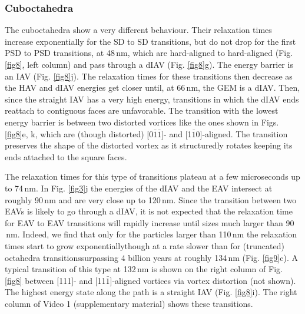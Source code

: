 \documentclass[review,authoryear]{elsarticle}
\newcommand{\nm}{\,\text{nm}}
\begin{document}
\subsubsection{Cuboctahedra}
The cuboctahedra show a very different behaviour. Their relaxation times increase exponentially for the SD to SD transitions, but do not drop for the first PSD to PSD transitions, at 48$\nm$, which are hard-aligned to hard-aligned (Fig. \ref{fig8}, left column) and pass through a dIAV (Fig. \ref{fig8}g). The energy barrier is an IAV (Fig. \ref{fig8}j). The relaxation times for these transitions then decrease as the HAV and dIAV energies get closer until, at 66$\nm$, the GEM is a dIAV. Then, since the straight IAV has a very high energy, transitions in which the dIAV ends reattach to contiguous faces are unfavorable. The transition with the lowest energy barrier is between two distorted vortices like the ones shown in Figs. \ref{fig8}e, k, which are (though distorted) [0$\bar{1}\bar{1}$]- and [1$\bar{1}$0]-aligned. The transition preserves the shape of the distorted vortex as it structuredly rotates keeping its ends attached to the square faces.\par

The relaxation times for this type of transitions plateau at a few microseconds up to 74$\nm$. In Fig. \ref{fig3}j the energies of the dIAV and the EAV intersect at roughly 90$\nm$ and are very close up to 120$\nm$. Since the transition between two EAVs is likely to go through a dIAV, it is not expected that the relaxation time for EAV to EAV transitions will rapidly increase until sizes much larger than 90$\nm$. Indeed, we find that only for the particles larger than 110$\,$nm the relaxation times start to grow exponentially{\textemdash}though at a rate slower than for (truncated) octahedra transitions{\textemdash}surpassing 4 billion years at roughly 134$\nm$ (Fig. \ref{fig9}c). A typical transition of this type at 132$\nm$ is shown on the right column of Fig. \ref{fig8} between [111]- and [11$\bar{1}$]-aligned vortices via vortex distortion (not shown). The highest energy state along the path is a straight IAV (Fig. \ref{fig8}i). The right column of Video 1 (supplementary material) shows these transitions.\par
\end{document}
